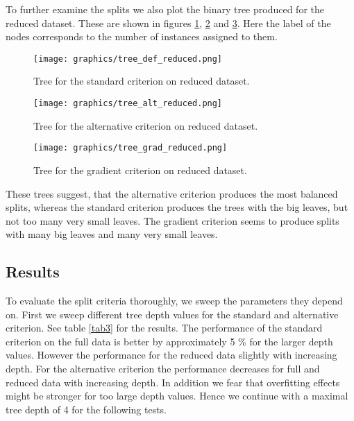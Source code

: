 \documentclass{article}
\begin{document}
\FloatBarrier

To further examine the splits we also plot the binary tree produced for the reduced dataset.
These are shown in figures \ref{fig2d}, \ref{fig2e} and \ref{fig2f}. 
Here the label of the nodes corresponds to the number of instances assigned to them.

\begin{figure}[h]
	\centering
	\texttt{[image: graphics/tree\_def\_reduced.png]}
	\caption{Tree for the standard criterion on reduced dataset.}
	\label{fig2d}
\end{figure}

\begin{figure}[h]
	\centering
	\texttt{[image: graphics/tree\_alt\_reduced.png]}
	\caption{Tree for the alternative criterion on reduced dataset.}
	\label{fig2e}
\end{figure}

\begin{figure}[h]
	\centering
	\texttt{[image: graphics/tree\_grad\_reduced.png]}
	\caption{Tree for the gradient criterion on reduced dataset.}
	\label{fig2f}
\end{figure}

These trees suggest, that the alternative criterion produces the most balanced splits, whereas the 
standard criterion produces the trees with the big leaves, but not too many very small leaves.
The gradient criterion seems to produce splits with many big leaves and many very small leaves.

\FloatBarrier

\subsection{Results}

To evaluate the split criteria thoroughly, we sweep the parameters they depend on.
\newline
First we sweep different tree depth values for the standard and alternative criterion.
See table \ref{tab3} for the results. The performance of the standard criterion on the full data 
is better by approximately 5 \% for the larger depth values.
However the performance for the reduced data slightly with increasing depth.
For the alternative criterion the performance decreases for full and reduced data with increasing depth.
In addition we fear that overfitting effects might be stronger for too large depth values.
Hence we continue with a maximal tree depth of 4 for the following tests.
\end{document}
